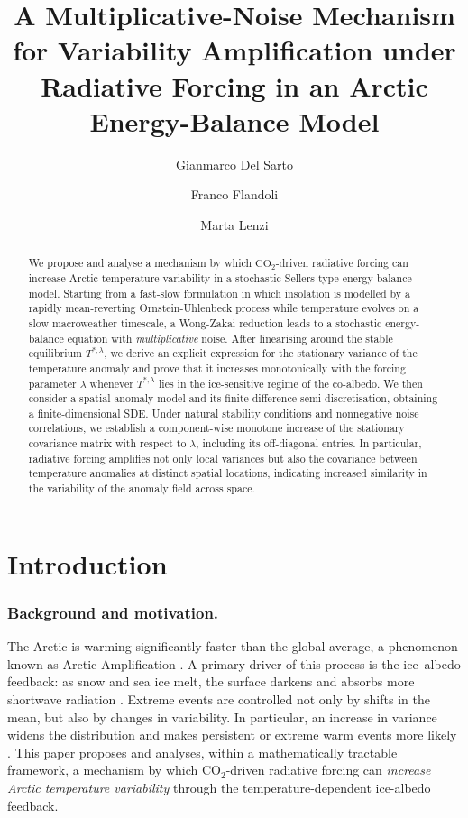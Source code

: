 \documentclass[10pt]{amsart}
\title[A multiplicative-noise mechanism for variability amplification in an Arctic EBM]{A Multiplicative-Noise Mechanism for Variability Amplification under Radiative Forcing in an Arctic Energy-Balance Model}
\author{Gianmarco Del Sarto}
\author{Franco Flandoli}
\author{Marta Lenzi}
\numberwithin{equation}{section}
\begin{document}
\maketitle

\begin{abstract}
    We propose and analyse a mechanism by which $\mathrm{CO}_2$-driven radiative forcing can increase Arctic temperature variability in a stochastic Sellers-type energy-balance model. Starting from a fast-slow formulation in which insolation is modelled by a rapidly mean-reverting Ornstein-Uhlenbeck process while temperature evolves on a slow macroweather timescale, a Wong-Zakai reduction leads to a stochastic energy-balance equation with \emph{multiplicative} noise. After linearising around the stable equilibrium $T^{*,\lambda}$, we derive an explicit expression for the stationary variance of the temperature anomaly and prove that it increases monotonically with the forcing parameter $\lambda$ whenever $T^{*,\lambda}$ lies in the ice-sensitive regime of the co-albedo. We then consider a spatial anomaly model and its finite-difference semi-discretisation, obtaining a finite-dimensional SDE. Under natural stability conditions and nonnegative noise correlations, we establish a component-wise monotone increase of the stationary covariance matrix with respect to $\lambda$, including its off-diagonal entries. In particular, radiative forcing amplifies not only local variances but also the covariance between temperature anomalies at distinct spatial locations, indicating increased similarity in the variability of the anomaly field across space.
\end{abstract}
\tableofcontents


\section*{Introduction}


\subsubsection*{Background and motivation.} The Arctic is warming significantly faster than the global average, a phenomenon known as Arctic Amplification \cite{Serreze}. A primary driver of this process is the ice–albedo feedback: as snow and sea ice melt, the surface darkens and absorbs more shortwave radiation \cite{Hall,Winton}. Extreme events are controlled not only by shifts in the mean, but also by changes in variability. In particular, an increase in variance widens the distribution and makes persistent or extreme warm events more likely \cite{IPCC2001,IPCC2021}. This paper proposes and analyses, within a mathematically tractable framework, a mechanism by which
$\mathrm{CO_2}$-driven radiative forcing can \emph{increase Arctic temperature variability} through the
temperature-dependent ice-albedo feedback. 
\end{document}
